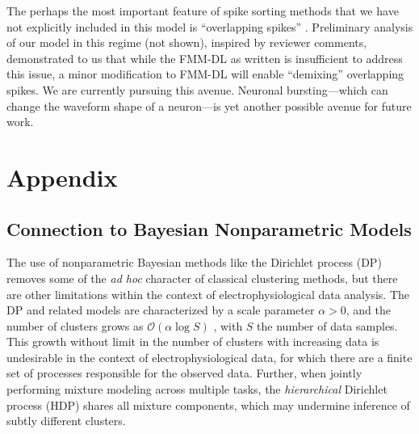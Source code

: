 \documentclass[journal]{IEEEtran}
\begin{document}
The perhaps the most important feature of spike sorting methods that we have not explicitly included in this model is ``overlapping spikes'' \cite{Bar-Gad2001, Zhang2004, Wang2006, Vargas-Irwin2007, Herbst2008a, Adamos2010, Franke2010b}. Preliminary analysis of our model in this regime (not shown), inspired by reviewer comments, demonstrated to us that while the FMM-DL as written is insufficient to address this issue, a minor modification to FMM-DL will enable ``demixing'' overlapping spikes.  We are currently pursuing this avenue.  Neuronal bursting---which can change the waveform shape of a neuron---is yet another possible avenue for future work.  


\section*{Appendix} \label{sec:appendix}

\setcounter{subsection}{0}
\subsection{Connection to Bayesian Nonparametric Models} %
\label{sub:connection_to_previous_bayesian_non_parametrics}


The use of nonparametric Bayesian methods like the Dirichlet process (DP) \cite{Wood2009,Bo2011} removes some of the \emph{ad hoc} character of classical clustering methods, but there are other limitations within the context of electrophysiological data analysis. The DP and related models are characterized by a scale parameter $\alpha>0$, and the number of clusters grows as $\mathcal{O}(\alpha \log S)$ \cite{Teh2010a}, with $S$ the number of data samples. This growth without limit in the number of clusters with increasing data is undesirable in the context of electrophysiological data, for which there are a finite set of processes responsible for the observed data. Further, when jointly performing mixture modeling across multiple tasks, the \emph{hierarchical} Dirichlet process (HDP) \cite{HDP} shares all mixture components, which may undermine inference of subtly different clusters.
\end{document}
